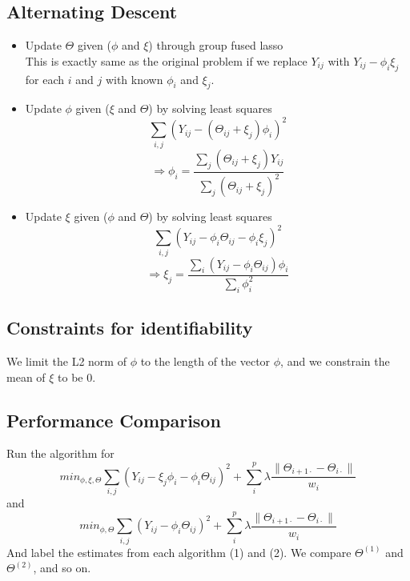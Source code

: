 \documentclass[11pt]{article}
\begin{document}
\subsection*{Alternating Descent}
\begin{itemize}

\item
Update $\Theta$ given ($\phi$ and $\xi$) through group fused lasso\\
This is exactly same as the original problem if we replace $Y_{ij}$ with $Y_{ij} - \phi_i\xi_j$ for each $i$ and $j$ with known $\phi_i$ and $\xi_j$.
\item
Update $\phi$  given ($\xi$ and $\Theta$) by solving least squares
$$\sum_{i,j}(Y_{ij} - (\Theta_{ij}+\xi_j)\phi_i)^2$$
$$\Rightarrow \phi_i = \frac{\sum_j (\Theta_{ij} + \xi_j)Y_{ij}}{
\sum_j (\Theta_{ij}+\xi_j)^2
}$$
\item
Update $\xi$ given ($\phi$ and $\Theta$) by solving least squares
$$\sum_{i,j} (Y_{ij} - \phi_i \Theta_{ij} - \phi_i \xi_j)^2$$
$$\Rightarrow \xi_j = \frac{
\sum_i (Y_{ij}-\phi_i \Theta_{ij})\phi_i
}{
\sum_i \phi_i^2
}$$

\end{itemize}

\subsection*{Constraints for identifiability}
We limit the L2 norm of $\phi$ to the length of the vector $\phi$, and we constrain the mean of $\xi$ to be 0. 

\subsection*{Performance Comparison}

Run the algorithm for
\begin{equation}
min_{\phi, \xi, \Theta} \sum_{i,j} (Y_{ij} - \xi_j \phi_i - \phi_i \Theta_{ij})^2 + \sum_{i}^p \lambda \frac{\|\Theta_{i+1\cdot} - \Theta_{i\cdot}  \|}{w_i}
\end{equation}
and 
\begin{equation}
min_{\phi, \Theta} \sum_{i,j} (Y_{ij} - \phi_i \Theta_{ij})^2 + \sum_{i}^p \lambda \frac{\|\Theta_{i+1\cdot} - \Theta_{i\cdot}  \|}{w_i}
\end{equation}
And label the estimates from each algorithm (1) and (2). We compare $\Theta^{(1)}$ and $\Theta^{(2)}$, and so on.
\end{document}
